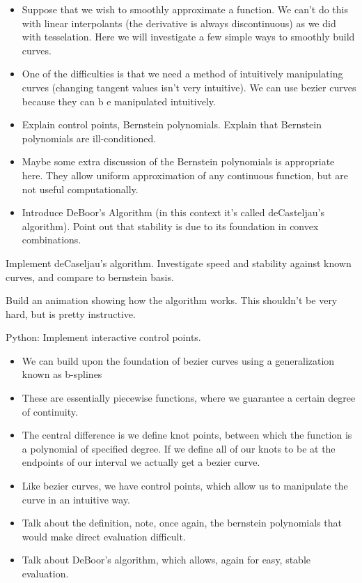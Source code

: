 

\begin{itemize}
\item Suppose that we wish to smoothly approximate a function. We can't do this with linear interpolants (the derivative is always discontinuous) as we did with tesselation. Here we will investigate a few simple ways to smoothly build curves.
\item One of the difficulties is that we need a method of intuitively manipulating curves (changing tangent values isn't very intuitive). We can use bezier curves because they can b e manipulated intuitively.
\item Explain control points, Bernstein polynomials. Explain that Bernstein polynomials are ill-conditioned.
\item Maybe some extra discussion of the Bernstein polynomials is appropriate here. They allow uniform approximation of any continuous function, but are not useful computationally.
\item Introduce DeBoor's Algorithm (in this context it's called deCasteljau's algorithm). Point out that stability is due to its foundation in convex combinations.
\end{itemize}
\begin{problem}
Implement deCaseljau's algorithm. Investigate speed and stability against known curves, and compare to bernstein basis.
\end{problem}

\begin{problem}
Build an animation showing how the algorithm works. This shouldn't be very hard, but is pretty instructive.
\end{problem}

\begin{problem}
Python: Implement interactive control points.
\end{problem}

\begin{itemize}
\item We can build upon the foundation of bezier curves using a generalization known as b-splines
\item These are essentially piecewise functions, where we guarantee a certain degree of continuity.
\item The central difference is we define knot points, between which the function is a polynomial of specified degree. If we define all of our knots to be at the endpoints of our interval we actually get a bezier curve.
\item Like bezier curves, we have control points, which allow us to manipulate the curve in an intuitive way.
\item Talk about the definition, note, once again, the bernstein polynomials that would make direct evaluation difficult.
\item Talk about DeBoor's algorithm, which allows, again for easy, stable evaluation.
\end{itemize}

